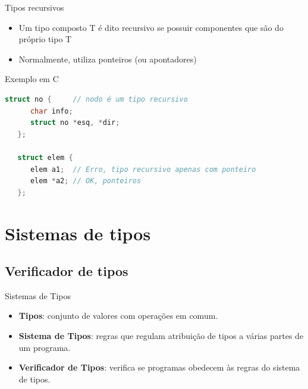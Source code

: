 \documentclass[handout]{beamer}
\begin{document}
\begin{frame}[fragile]{Tipos recursivos}

   \begin{itemize}
   \item Um tipo composto T é dito recursivo se possuir componentes que são do próprio tipo T
   \item Normalmente, utiliza ponteiros (ou apontadores)
   \end{itemize}
	\begin{block}{Exemplo em C}
	\begin{lstlisting}[language=C,numbers=none]
   struct no {     // nodo é um tipo recursivo
      char info;
      struct no *esq, *dir;
   };

   struct elem {
      elem a1;  // Erro, tipo recursivo apenas com ponteiro
      elem *a2; // OK, ponteiros
   };
  \end{lstlisting}
\end{block}

\end{frame}

\section{Sistemas de tipos}

\subsection{Verificador de tipos}

\begin{frame}{Sistemas de Tipos}

\begin{itemize}
\item \textbf{Tipos}: conjunto de valores com operações em comum.

\item \textbf{Sistema de Tipos}: regras que regulam atribuição de tipos a várias partes de um programa.

\item \textbf{Verificador de Tipos}: verifica se programas obedecem às regras do sistema de tipos.

\end{itemize}
\end{frame}
\end{document}
